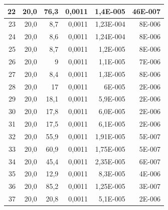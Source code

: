 \documentclass[12pt]{scrartcl}
\begin{document}
\begin{table}[H]
\begin{center}
\begin{tabular}{|r|r|r|r|r|r|}
22 & 20,0 & 76,3 & 0,0011 & 1,4E-005 & 46E-007 \\ \hline
23 & 20,0 & 8,7 & 0,0011 & 1,23E-004 & 8E-006 \\ \hline
24 & 20,0 & 8,6 & 0,0011 & 1,24E-004 & 8E-006 \\ \hline
25 & 20,0 & 8,7 & 0,0011 & 1,2E-005 & 8E-006 \\ \hline
26 & 20,0 & 9 & 0,0011 & 1,1E-005 & 7E-006 \\ \hline
27 & 20,0 & 8,4 & 0,0011 & 1,3E-005 & 8E-006 \\ \hline
28 & 20,0 & 17 & 0,0011 & 6E-005 & 2E-006 \\ \hline
29 & 20,0 & 18,1 & 0,0011 & 5,9E-005 & 2E-006 \\ \hline
30 & 20,0 & 17,8 & 0,0011 & 6,0E-005 & 2E-006 \\ \hline
31 & 20,0 & 17,5 & 0,0011 & 6,1E-005 & 2E-006 \\ \hline
32 & 20,0 & 55,9 & 0,0011 & 1,91E-005 & 5E-007 \\ \hline
33 & 20,0 & 60,9 & 0,0011 & 1,75E-005 & 5E-007 \\ \hline
34 & 20,0 & 45,4 & 0,0011 & 2,35E-005 & 6E-007 \\ \hline
35 & 20,0 & 12,9 & 0,0011 & 8,3E-005 & 4E-006 \\ \hline
36 & 20,0 & 85,2 & 0,0011 & 1,25E-005 & 3E-007 \\ \hline
37 & 20,0 & 20,8 & 0,0011 & 5,1E-005 & 2E-006 \\ \hline
\end{tabular}
\end{center}
\label{tab:messwerte_2}
\end{table}
\end{document}
